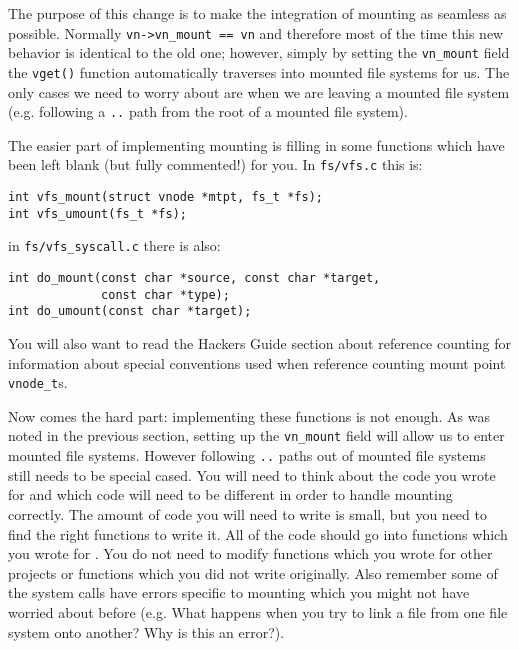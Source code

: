 The purpose of this change is to make the integration of mounting as seamless as possible. Normally \texttt{vn->vn\_mount == vn} and therefore most of the time this new behavior is identical to the old one; however, simply by setting the \texttt{vn\_mount} field the \texttt{vget()} function automatically traverses into mounted file systems for us. The only cases we need to worry about are when we are leaving a mounted file system (e.g. following a \texttt{..} path from the root of a mounted file system).

The easier part of implementing mounting is filling in some functions which have been left blank (but fully commented!) for you. In \texttt{fs/vfs.c} this is:
\begin{verbatim}
int vfs_mount(struct vnode *mtpt, fs_t *fs);
int vfs_umount(fs_t *fs);\end{verbatim}
in \texttt{fs/vfs\_syscall.c} there is also:
\begin{verbatim}
int do_mount(const char *source, const char *target,
             const char *type);
int do_umount(const char *target);\end{verbatim}

You will also want to read the Hackers Guide section about reference counting for information about special conventions used when reference counting mount point \texttt{vnode\_t}s.

Now comes the hard part: implementing these functions is not enough. As was noted in the previous section, setting up the \texttt{vn\_mount} field will allow us to enter mounted file systems. However following \texttt{..} paths out of mounted file systems still needs to be special cased. You will need to think about the code you wrote for  and which code will need to be different in order to handle mounting correctly. The amount of code you will need to write is small, but you need to find the right functions to write it. All of the code should go into functions which you wrote for . You do not need to modify functions which you wrote for other projects or functions which you did not write originally. Also remember some of the system calls have errors specific to mounting which you might not have worried about before (e.g. What happens when you try to link a file from one file system onto another? Why is this an error?).

